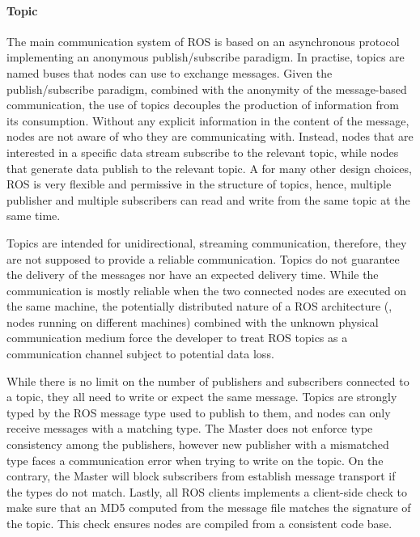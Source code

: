 \paragraph{Topic} The main communication system of ROS is based on an asynchronous protocol implementing an anonymous publish/subscribe paradigm. In practise, topics are named buses that nodes can use to exchange messages. Given the publish/subscribe paradigm, combined with the anonymity of the message-based communication, the use of topics decouples the production of information from its consumption. Without any explicit information in the content of the message, nodes are not aware of who they are communicating with. Instead, nodes that are interested in a specific data stream subscribe to the relevant topic, while nodes that generate data publish to the relevant topic. A for many other design choices, ROS is very flexible and permissive in the structure of topics, hence, multiple publisher and multiple subscribers can read and write from the same topic at the same time.

Topics are intended for unidirectional, streaming communication, therefore, they are not supposed to provide a reliable communication. Topics do not guarantee the delivery of the messages nor have an expected delivery time. While the communication is mostly reliable when the two connected nodes are executed on the same machine, the potentially distributed nature of a ROS architecture (\ie, nodes running on different machines) combined with the unknown physical communication medium force the developer to treat ROS topics as a communication channel subject to potential data loss.

While there is no limit on the number of publishers and subscribers connected to a topic, they all need to write or expect the same message. Topics are strongly typed by the ROS message type used to publish to them, and nodes can only receive messages with a matching type. The Master does not enforce type consistency among the publishers, however new publisher with a mismatched type faces a communication error when trying to write on the topic. On the contrary, the Master will block subscribers from establish message transport if the types do not match. Lastly, all ROS clients implements a client-side check to make sure that an MD5 computed from the message file matches the signature of the topic. This check ensures nodes are compiled from a consistent code base.

